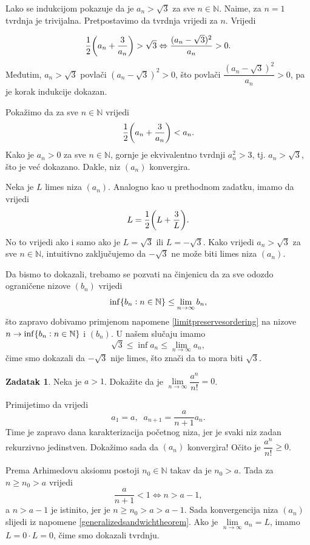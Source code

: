 \documentclass{book}
\let\originalleft\left
\let\originalright\right
\renewcommand{\left}{\mathopen{}\mathclose\bgroup\originalleft}
\renewcommand{\right}{\aftergroup\egroup\originalright}
\renewenvironment{proof}{%
    \vspace{-\parskip}\begin{oldproof}%
    }{%
    \end{oldproof}%
}
\theoremstyle{definition}
\theoremstyle{definition}
\newtheorem{exercise}{Zadatak}
\theoremstyle{remark}
\begin{document}
\begin{proof}[Rješenje]
Lako se indukcijom pokazuje da je $a_n>\sqrt{3}$ za sve $n\in \mathbb{N}$. Naime, za $n=1$ tvrdnja je trivijalna. Pretpostavimo da tvrdnja vrijedi za $n$. Vrijedi

$$\dfrac{1}{2}\left(a_n+\dfrac{3}{a_n}\right)>\sqrt{3}\Leftrightarrow \dfrac{(a_n-\sqrt{3})^2}{a_n}>0.$$
Međutim, $a_n>\sqrt{3}$ povlači $(a_n-\sqrt{3})^2>0$, što povlači $\dfrac{(a_n-\sqrt{3})^2}{a_n}>0$, pa je korak indukcije dokazan.

Pokažimo da za sve $n\in \mathbb{N}$ vrijedi
$$\dfrac{1}{2}\left(a_n+\dfrac{3}{a_n}\right)<a_n.$$
Kako je $a_n>0$ za sve $n\in \mathbb{N}$, gornje je ekvivalentno tvrdnji $a_n^2>3$, tj. $a_n>\sqrt{3}$, što je već dokazano. Dakle, niz $(a_n)$ konvergira.

Neka je $L$ limes niza $(a_n)$. Analogno kao u prethodnom zadatku, imamo da vrijedi 
$$L=\dfrac{1}{2}\left(L+\dfrac{3}{L}\right).$$ No to vrijedi ako i samo ako je $L=\sqrt{3}$ ili $L=-\sqrt{3}$. Kako vrijedi $a_n> \sqrt{3}$ za sve $n\in \mathbb{N}$, intuitivno zaključujemo da $-\sqrt{3}$ ne može biti limes niza $(a_n)$. 

Da bismo to dokazali, trebamo se pozvati na činjenicu da za sve odozdo ograničene nizove $(b_n)$ vrijedi $$\inf\left\{b_n : n\in \mathbb{N}\right\}\leq \lim\limits_{n\to \infty}{b_n},$$ što zapravo dobivamo primjenom napomene \ref{limitpreservesordering} na nizove $n\to \inf\left\{b_n : n\in \mathbb{N}\right\}$ i $(b_n)$. U našem slučaju imamo $$\sqrt{3}\leq \inf{a_n}\leq \lim\limits_{n\to \infty}{a_n},$$ čime smo dokazali da $-\sqrt{3}$ nije limes, što znači da to mora biti $\sqrt{3}$.
\end{proof}
\begin{exercise}
Neka je $a>1$. Dokažite da je $\lim\limits_{n\to \infty}{\dfrac{a^n}{n!}}=0$.
\end{exercise}
\begin{proof}[Rješenje]
Primijetimo da vrijedi $$a_1=a,\;\;a_{n+1}=\dfrac{a}{n+1}a_{n}.$$ Time je zapravo dana karakterizacija početnog niza, jer je svaki niz zadan rekurzivno jedinstven. Dokažimo sada da $(a_n)$ konvergira! Očito je $\dfrac{a^n}{n!}\geq 0$. 

Prema Arhimedovu aksiomu postoji $n_0\in \mathbb{N}$ takav da je $n_0>a$. Tada za $n\geq n_0>a$ vrijedi $$\dfrac{a}{n+1}<1\Leftrightarrow n>a-1,$$ 
a $n>a-1$ je istinito, jer je $n\geq n_0>a>a-1$. Sada konvergencija niza $(a_n)$ slijedi iz napomene \ref{generalizedsandwichtheorem}. Ako je $\lim\limits_{n\to \infty}{a_n}=L$, imamo $L=0\cdot L=0$, čime smo dokazali tvrdnju.
\end{proof}
\end{document}
